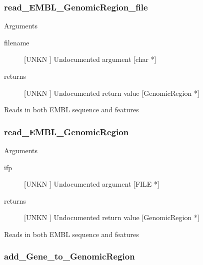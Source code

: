 \subsubsection{read_EMBL_GenomicRegion_file}

Arguments
\begin{description}
\item[filename] [UNKN ] Undocumented argument [char *]
\item[returns] [UNKN ] Undocumented return value [GenomicRegion *]
\end{description}
Reads in both EMBL sequence and features 


\subsubsection{read_EMBL_GenomicRegion}

Arguments
\begin{description}
\item[ifp] [UNKN ] Undocumented argument [FILE *]
\item[returns] [UNKN ] Undocumented return value [GenomicRegion *]
\end{description}
Reads in both EMBL sequence and features 


\subsubsection{add_Gene_to_GenomicRegion}


